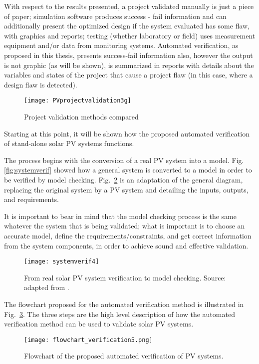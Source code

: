 With respect to the results presented, a project validated manually is just a piece of paper; simulation software produces success - fail information and can additionally present the optimized design if the system evaluated has some flaw, with graphics and reports; testing (whether laboratory or field) uses  measurement equipment and/or data from monitoring systems. Automated verification, as proposed in this thesis, presents success-fail information also, however the output is not graphic  (as will be shown), is summarized in reports with details about the variables and states of the project that cause a project flaw (in this case,  where a design flaw is detected).

\begin{figure}[h]
\texttt{[image: PVprojectvalidation3g]}
\centering
\caption{Project validation methods compared}
\label{fig:validation}
\end{figure}

Starting at this point, it will be shown how the proposed automated verification of stand-alone solar PV systems functions. 

The process begins with the conversion of a real PV system into a model. Fig. \ref{fig:systemverif} showed how a general system is converted to a model in order to be verified by model checking. Fig.~\ref{fig:systemverif4} is an adaptation of the general diagram, replacing the original system by a PV system and detailing the inputs, outputs, and requirements. 

It is important to bear in mind that the model checking process is the same whatever the system that is being validated; what is  important is to choose an accurate model, define the requirements/constraints, and get correct information from the system components, in order to achieve sound and effective validation.

\begin{figure}[h]
\texttt{[image: systemverif4]}
\centering
\caption{From real solar PV system verification to model checking. Source: adapted from \cite{Clarke2008}.}
\label{fig:systemverif4}
\end{figure}

The flowchart proposed for the automated verification method is illustrated in Fig.~\ref{fig:flowchartgeneral}. The three steps are the high level description of how the automated verification method can be used to validate solar PV systems.

\begin{figure}[h]
\texttt{[image: flowchart\_verification5.png]}
\centering
\caption{Flowchart of the proposed automated verification of PV systems.}
\label{fig:flowchartgeneral}
\end{figure}


